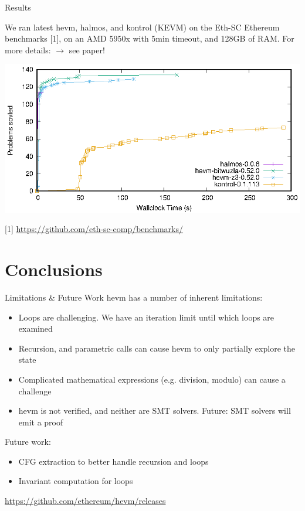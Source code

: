\documentclass[aspectratio=169]{beamer}
\begin{document}
\begin{frame}[fragile=singleslide]{Results}

We ran latest hevm, halmos, and kontrol (KEVM) on the Eth-SC Ethereum benchmarks [1], on an AMD 5950x with 5min timeout,  and 128GB of RAM. For more details: $\rightarrow$ see paper!
{
\begin{center}
\includegraphics{cdf}
\end{center}
}


[1] \qquad  \url{https://github.com/eth-sc-comp/benchmarks/}
\end{frame}


\section{Conclusions}

\begin{frame}[fragile=singleslide]{Limitations \& Future Work}
hevm has a number of inherent limitations:

\begin{itemize}
\item Loops are challenging. We have an iteration limit until which loops are examined
\item Recursion, and parametric calls can cause hevm to only partially explore the state
\item Complicated mathematical expressions (e.g. division, modulo) can cause a challenge
\item hevm is not verified, and neither are SMT solvers. Future: SMT solvers will emit a proof
\end{itemize}
\vspace{2ex}

Future work:
\begin{itemize}
\item CFG extraction to better handle recursion and loops
\item Invariant computation for loops
\end{itemize}

\bigskip

\quad  {}
\qquad \url{https://github.com/ethereum/hevm/releases}

\end{frame}
\end{document}
